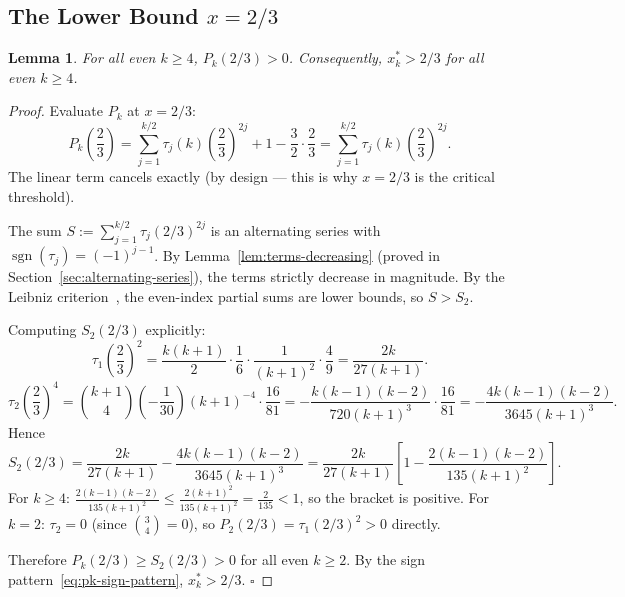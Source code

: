 \documentclass[12pt,a4paper]{article}
\theoremstyle{plain}
\newtheorem{lemma}[theorem]{Lemma}
\theoremstyle{definition}
\begin{document}
\subsection{The Lower Bound $x = 2/3$}
\label{sec:two-thirds}

\begin{lemma}\label{lem:pk-two-thirds}
  For all even $k \ge 4$, $P_k(2/3) > 0$.  Consequently,
  $x^*_k > 2/3$ for all even $k \ge 4$.
\end{lemma}

\begin{proof}
  Evaluate $P_k$ at $x = 2/3$:
  \[
    P_k\!\left(\frac{2}{3}\right)
    = \sum_{j=1}^{k/2} \tau_j(k) \left(\frac{2}{3}\right)^{2j}
      + 1 - \frac{3}{2} \cdot \frac{2}{3}
    = \sum_{j=1}^{k/2} \tau_j(k) \left(\frac{2}{3}\right)^{2j}.
  \]
  The linear term cancels exactly (by design --- this is why $x=2/3$ is
  the critical threshold).

  The sum $S := \sum_{j=1}^{k/2} \tau_j (2/3)^{2j}$ is an alternating
  series with $\operatorname{sgn}(\tau_j) = (-1)^{j-1}$.  By
  Lemma~\ref{lem:terms-decreasing} (proved in Section~\ref{sec:alternating-series}),
  the terms strictly decrease in magnitude.  By the Leibniz
  criterion~\cite{Leibniz}, the even-index
  partial sums are lower bounds, so $S > S_2$.

  Computing $S_2(2/3)$ explicitly:
  \[
    \tau_1\!\left(\frac{2}{3}\right)^{\!2}
    = \frac{k(k+1)}{2} \cdot \frac{1}{6} \cdot \frac{1}{(k+1)^2}
      \cdot \frac{4}{9}
    = \frac{2k}{27(k+1)}.
  \]
  \[
    \tau_2\!\left(\frac{2}{3}\right)^{\!4}
    = \binom{k+1}{4} \!\left(-\frac{1}{30}\right) (k+1)^{-4}
      \cdot \frac{16}{81}
    = -\frac{k(k-1)(k-2)}{720(k+1)^3} \cdot \frac{16}{81}
    = -\frac{4k(k-1)(k-2)}{3645(k+1)^3}.
  \]
  Hence
  \[
    S_2(2/3)
    = \frac{2k}{27(k+1)}
      - \frac{4k(k-1)(k-2)}{3645(k+1)^3}
    = \frac{2k}{27(k+1)}
      \left[1 - \frac{2(k-1)(k-2)}{135(k+1)^2}\right].
  \]
  For $k \ge 4$:
  $\frac{2(k-1)(k-2)}{135(k+1)^2}
   \le \frac{2(k+1)^2}{135(k+1)^2}
   = \frac{2}{135} < 1$, so the bracket is positive.
  For $k = 2$: $\tau_2 = 0$ (since $\binom{3}{4}=0$), so
  $P_2(2/3) = \tau_1(2/3)^2 > 0$ directly.

  Therefore $P_k(2/3) \ge S_2(2/3) > 0$ for all even $k \ge 2$.
  By the sign pattern~\eqref{eq:pk-sign-pattern},
  $x^*_k > 2/3$.  \hfill$\square$
\end{proof}
\end{document}
